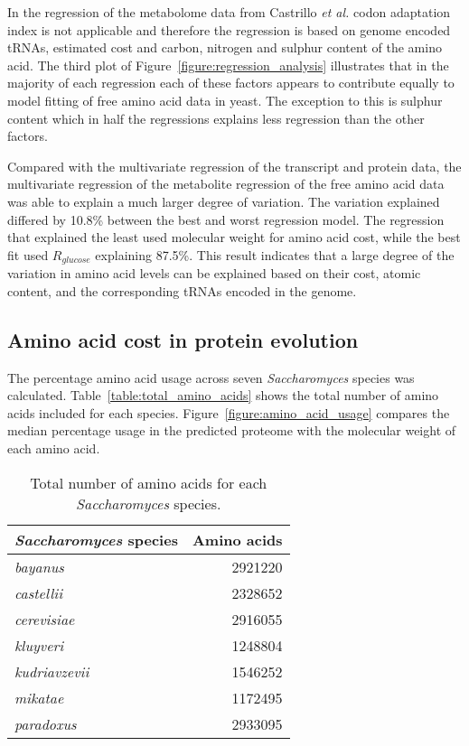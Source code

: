 In the regression of the metabolome data from Castrillo \emph{et al.} \cite{castrillo2007} codon adaptation index is not applicable and therefore the regression is based on genome encoded tRNAs, estimated cost and carbon, nitrogen and sulphur content of the amino acid. The third plot of Figure~\ref{figure:regression_analysis} illustrates that in the majority of each regression each of these factors appears to contribute equally to model fitting of free amino acid data in yeast. The exception to this is sulphur content which in half the regressions explains less regression than the other factors.

Compared with the multivariate regression of the transcript and protein data, the multivariate regression of the metabolite regression of the free amino acid data was able to explain a much larger degree of variation. The variation explained differed by 10.8\% between the best and worst regression model. The regression that explained the least used molecular weight for amino acid cost, while the best fit used $R_{glucose}$ explaining 87.5\%. This result indicates that a large degree of the variation in amino acid levels can be explained based on their cost, atomic content, and the corresponding tRNAs encoded in the genome.

\subsection{Amino acid cost in protein evolution}

The percentage amino acid usage across seven \emph{Saccharomyces} species was calculated. Table~\vref{table:total_amino_acids} shows the total number of amino acids included for each species. Figure~\vref{figure:amino_acid_usage} compares the median percentage usage in the predicted proteome with the molecular weight of each amino acid.

\begin{table}
  \centering
  \begin{tabular}{ l r }
                                                  \toprule
    \emph{Saccharomyces} species & Amino acids \\ \midrule
    \emph{bayanus}               & 2921220     \\
    \emph{castellii}             & 2328652     \\
    \emph{cerevisiae}            & 2916055     \\
    \emph{kluyveri}              & 1248804     \\
    \emph{kudriavzevii}          & 1546252     \\
    \emph{mikatae}               & 1172495     \\
    \emph{paradoxus}             & 2933095     \\ \bottomrule
  \end{tabular}
  \caption{Total number of amino acids for each \emph{Saccharomyces} species.}
  \label{table:total_amino_acids}
\end{table}

